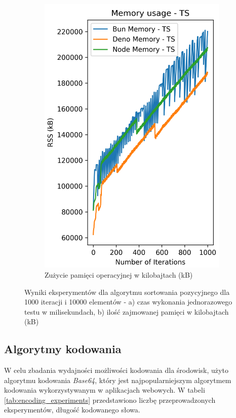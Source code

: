 \begin{figure}[H]
\begin{subfigure}[b]{0.42\textwidth}
    \includegraphics[width=\textwidth]{Figures/sorting/sorting_radix_1000_10000_ts_memory.png}
    \caption{Zużycie pamięci operacyjnej w kilobajtach (kB)}
    \label{fig:radix_sorting_e4_ts_memory}
  \end{subfigure}
  \hfill
  \caption{Wyniki eksperymentów dla algorytmu sortowania pozycyjnego dla 1000 iteracji i 10000 elementów - a) czas wykonania jednorazowego testu w milisekundach, b) ilość zajmowanej pamięci w kilobajtach (kB)}
  \label{fig:radix_sorting_e4_ts}
\end{figure}

\subsection{Algorytmy kodowania}
W celu zbadania wydajności możliwości kodowania dla środowisk, użyto algorytmu kodowania \textit{Base64}, który jest najpopularniejszym algorytmem kodowania wykorzystywanym w aplikacjach webowych. W tabeli \ref{tab:encoding_experiments} przedstawiono liczbę przeprowadzonych eksperymentów, długość kodowanego słowa.

